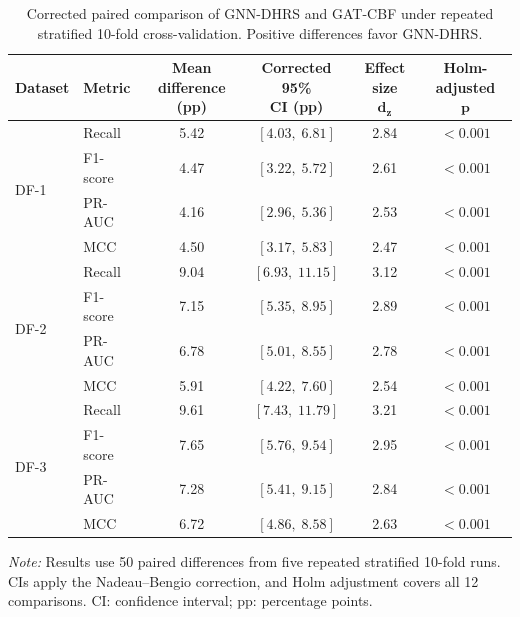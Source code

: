 \documentclass[pdflatex,sn-mathphys-num]{sn-jnl}%
\theoremstyle{thmstyleone}%
\theoremstyle{thmstyletwo}%
\theoremstyle{thmstylethree}%
\begin{document}
\begin{table}[!ht]
\centering
\caption{
Corrected paired comparison of GNN-DHRS and GAT-CBF under repeated
stratified 10-fold cross-validation. Positive differences favor GNN-DHRS.
}
\label{tab:statistical_comparison_results}
\small
\setlength{\tabcolsep}{5pt}
\renewcommand{\arraystretch}{1.08}
\begin{tabular}{@{}llcccc@{}}
\toprule
\textbf{Dataset} &
\textbf{Metric} &
\shortstack{\textbf{Mean difference}\\\textbf{(pp)}} &
\shortstack{\textbf{Corrected 95\%}\\\textbf{CI (pp)}} &
\shortstack{\textbf{Effect size}\\\(\boldsymbol{d_z}\)} &
\shortstack{\textbf{Holm-adjusted}\\\(\boldsymbol{p}\)} \\
\midrule

\multirow{4}{*}{DF-1}
& Recall   & 5.42 & $[4.03,\;6.81]$ & 2.84 & $<0.001$ \\
& F1-score & 4.47 & $[3.22,\;5.72]$ & 2.61 & $<0.001$ \\
& PR-AUC   & 4.16 & $[2.96,\;5.36]$ & 2.53 & $<0.001$ \\
& MCC      & 4.50 & $[3.17,\;5.83]$ & 2.47 & $<0.001$ \\
\midrule

\multirow{4}{*}{DF-2}
& Recall   & 9.04 & $[6.93,\;11.15]$ & 3.12 & $<0.001$ \\
& F1-score & 7.15 & $[5.35,\;8.95]$ & 2.89 & $<0.001$ \\
& PR-AUC   & 6.78 & $[5.01,\;8.55]$ & 2.78 & $<0.001$ \\
& MCC      & 5.91 & $[4.22,\;7.60]$ & 2.54 & $<0.001$ \\
\midrule

\multirow{4}{*}{DF-3}
& Recall   & 9.61 & $[7.43,\;11.79]$ & 3.21 & $<0.001$ \\
& F1-score & 7.65 & $[5.76,\;9.54]$ & 2.95 & $<0.001$ \\
& PR-AUC   & 7.28 & $[5.41,\;9.15]$ & 2.84 & $<0.001$ \\
& MCC      & 6.72 & $[4.86,\;8.58]$ & 2.63 & $<0.001$ \\
\bottomrule
\end{tabular}

\vspace{2pt}
\begin{minipage}{0.96\textwidth}
\footnotesize
\textit{Note:} Results use 50 paired differences from five repeated
stratified 10-fold runs. CIs apply the Nadeau--Bengio correction, and Holm
adjustment covers all 12 comparisons. CI: confidence interval; pp: percentage
points.
\end{minipage}
\end{table}
\endgroup
\end{document}
